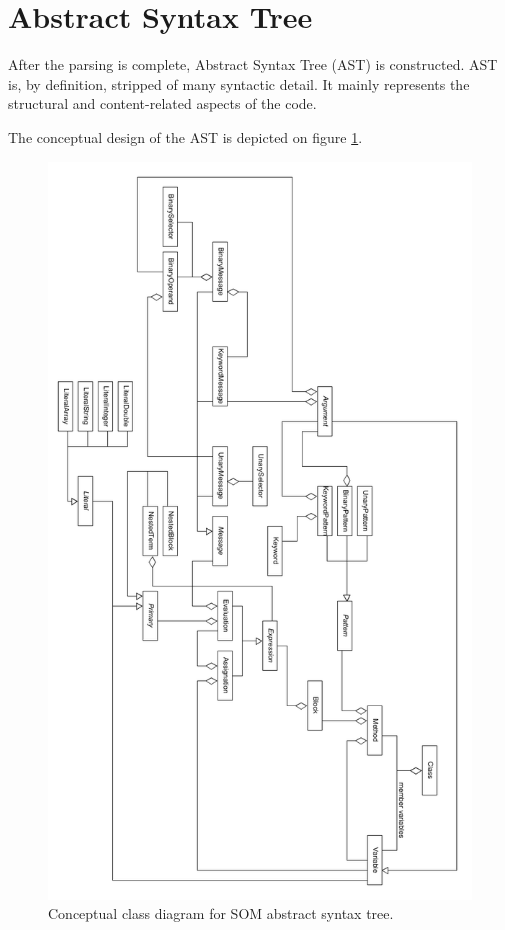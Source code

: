 \documentclass[thesis=M,english]{FITthesis}[2019/12/23]
\begin{document}
\section{Abstract Syntax Tree}
After the parsing is complete, Abstract Syntax Tree (AST) is constructed. AST is, by definition, stripped of many syntactic detail.
It mainly represents the structural and content-related aspects of the code.

The conceptual design of the AST is depicted on figure \ref{fig:ast_class_concept}.

\begin{figure}[hp!]
	\centering
	\includegraphics[width=\textwidth, height=\textheight]{media/ast/ast_concept.png}
	\caption{Conceptual class diagram for SOM abstract syntax tree.}
	\label{fig:ast_class_concept}
\end{figure}
\end{document}
